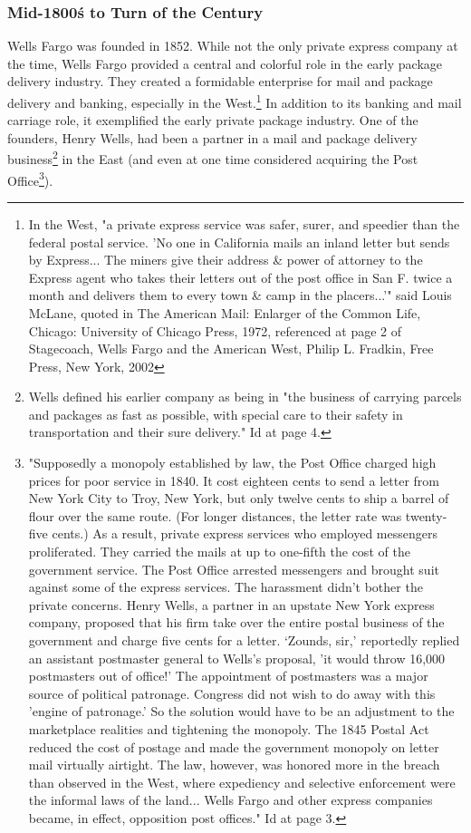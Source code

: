\subsubsection{Mid-1800\'s to Turn of the Century}
Wells Fargo was founded in 1852. While not the only private express company at the time, Wells Fargo provided a central and colorful role in the early package delivery industry. They created a formidable enterprise for mail and package delivery and banking, especially in the West.\footnote{In the West, "a private express service was safer, surer, and speedier than the federal postal service. 'No one in California mails an inland letter but sends by Express... The miners give their address \& power of attorney to the Express agent who takes their letters out of the post office in San F. twice a month and delivers them to every town \& camp in the placers...'" said Louis McLane, quoted in The American Mail: Enlarger of the Common Life, Chicago: University of Chicago Press, 1972, referenced at page 2 of Stagecoach, Wells Fargo and the American West, Philip L. Fradkin,  Free Press, New York, 2002} In addition to its banking and mail carriage role, it exemplified the early private package industry. One of the founders, Henry Wells, had been a partner in a mail and package delivery business\footnote{Wells defined his earlier company as being in  "the business of carrying parcels and packages as fast as possible, with special care to their safety in transportation and their sure delivery." Id at page 4.} in the East (and even at one time considered acquiring the Post Office\footnote{"Supposedly a monopoly established by law, the Post Office charged high prices for poor service in 1840.  It cost eighteen cents to send a letter from New York City to Troy, New York, but only twelve cents to ship a barrel of flour over the same route. (For longer distances, the letter rate was twenty-five cents.) As a result, private express services who employed messengers proliferated.  They carried the mails at up to one-fifth the cost of the government service.  The Post Office arrested messengers and brought suit against some of the express services.  The harassment didn’t bother the private concerns.  Henry Wells, a partner in an upstate New York express company, proposed that his firm take over the entire postal business of the government and charge five cents for a letter. ‘Zounds, sir,’ reportedly replied an assistant postmaster general to Wells’s proposal, 'it would throw 16,000 postmasters out of office!’  The appointment of postmasters was a major source of political patronage.  Congress did not wish to do away with this 'engine of patronage.' So the solution would have to be an adjustment to the marketplace realities and tightening the monopoly.  The 1845 Postal Act reduced the cost of postage and made the government monopoly on letter mail virtually airtight.  The law, however, was honored more in the breach than observed in the West, where expediency and selective enforcement were the informal laws of the land... Wells Fargo and other express companies became, in effect, opposition post offices."  Id at page 3.}). 

